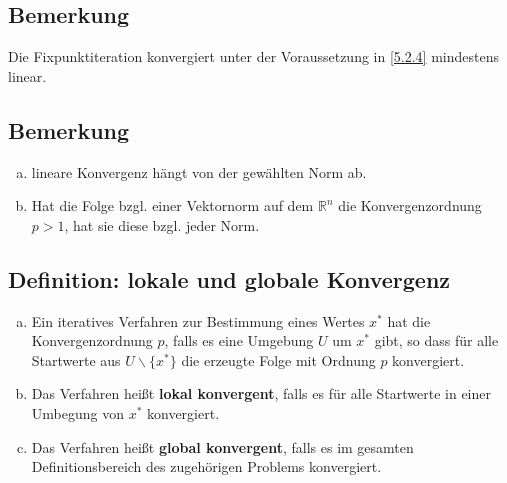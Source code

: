 \documentclass[ngerman,fontsize=11pt, paper=a4, parskip=half, titlepage=true, toc=bib]{scrbook}
\newcommand{\R}{\mathds{R}}
\begin{document}
	
	\subsection{Bemerkung}
	Die Fixpunktiteration konvergiert unter der Voraussetzung in \ref{5.2.4} mindestens linear.
	
	\subsection{Bemerkung}
	\begin{enumerate}[a)]
		\item  lineare Konvergenz hängt von der gewählten Norm ab.
		\item Hat die Folge bzgl. einer Vektornorm auf dem $\R^n$ die Konvergenzordnung $p>1$,
		hat sie diese bzgl. jeder Norm.
	\end{enumerate}
	
	\subsection{Definition: lokale und globale Konvergenz} \label{5.3.4}
	\begin{enumerate}[a)]
		\item Ein iteratives Verfahren zur Bestimmung eines Wertes $x^{*}$ hat 
		die Konvergenzordnung $p$, falls es eine Umgebung $U$ um $x^{*}$ gibt, 
		so dass für alle Startwerte aus $U\backslash \{x^{*}\}$ die erzeugte Folge mit Ordnung $p$ konvergiert.
		\item Das Verfahren heißt \textbf{lokal konvergent},
		falls es für alle Startwerte in einer Umbegung von $x^{*}$ konvergiert.
		\item Das Verfahren heißt \textbf{global konvergent},
		falls es im gesamten Definitionsbereich des zugehörigen Problems konvergiert.
	\end{enumerate}
	
	
\end{document}
